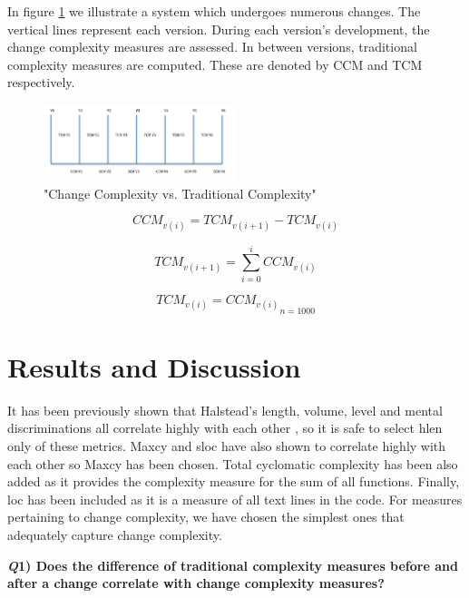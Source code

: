 \documentclass[9pt,twocolumn,a4paper]{article}
\begin{document}
In figure \ref{fig:ccVstc} we illustrate a system which undergoes numerous changes. The vertical lines represent each version. During each version's development, the change complexity measures are assessed. In between versions, traditional complexity measures are computed. These are denoted by CCM and TCM respectively.

\begin{figure}[h!]
  \centering
  \includegraphics[width=0.5\textwidth]{change_complexity_figure}
   \caption{"Change Complexity vs. Traditional Complexity"}
   \label{fig:ccVstc}
\end{figure}



\begin{equation}
{{CCM_{v(i)}} = {TCM_{v(i+1)}}-{TCM_{v(i)}}}
\end{equation}

\begin{equation}
{{TCM_{v(i+1)}} = \sum\limits_{i=0}^iCCM_{v(i)}}
\end{equation}
 
\begin{equation}
{{{TCM_{v(i)}} = CCM_{v(i)}}   _{n=1000}}
\end{equation}

\section{Results and Discussion}

It has been previously shown that Halstead's length, volume, level and mental discriminations all correlate highly with each other \cite{Israel}, so it is safe to select hlen only of these metrics. Maxcy and sloc have also shown to correlate highly with each other so Maxcy has been chosen. Total cyclomatic complexity has been also added as it provides the complexity measure for the sum of all functions. Finally, loc has been included as it is a measure of all text lines in the code. For measures pertaining to change complexity, we have chosen the simplest ones that adequately capture change complexity. 
\newline

{\bf{\emph Q1) Does the difference of traditional complexity measures before and after a change correlate with change complexity measures?}}
\newline
\end{document}
